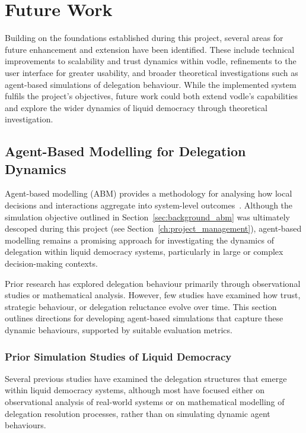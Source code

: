 \chapter{Future Work}

Building on the foundations established during this project, several areas for future enhancement and extension have been identified. These include technical improvements to scalability and trust dynamics within vodle, refinements to the user interface for greater usability, and broader theoretical investigations such as agent-based simulations of delegation behaviour. While the implemented system fulfils the project's objectives, future work could both extend vodle's capabilities and explore the wider dynamics of liquid democracy through theoretical investigation.

\section{Agent-Based Modelling for Delegation Dynamics}

Agent-based modelling (ABM) provides a methodology for analysing how local decisions and interactions aggregate into system-level outcomes~\citep{bonabeau2002agent}. Although the simulation objective outlined in Section~\ref{sec:background_abm} was ultimately descoped during this project (see Section~\ref{ch:project_management}), agent-based modelling remains a promising approach for investigating the dynamics of delegation within liquid democracy systems, particularly in large or complex decision-making contexts.

Prior research has explored delegation behaviour primarily through observational studies or mathematical analysis. However, few studies have examined how trust, strategic behaviour, or delegation reluctance evolve over time. This section outlines directions for developing agent-based simulations that capture these dynamic behaviours, supported by suitable evaluation metrics.

\subsection{Prior Simulation Studies of Liquid Democracy}

Several previous studies have examined the delegation structures that emerge within liquid democracy systems, although most have focused either on observational analysis of real-world systems or on mathematical modelling of delegation resolution processes, rather than on simulating dynamic agent behaviours.

